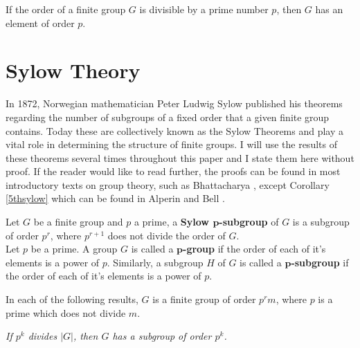 \vspace{-10mm}

\begin{theorem}
     If the order of a finite group $G$ is divisible by a prime number $p$, then $G$ has an element of order $p$. \\
\end{theorem} 

\section{Sylow Theory}

In 1872, Norwegian mathematician Peter Ludwig Sylow published his theorems regarding the number of subgroups of a fixed order that a given finite group contains. 
Today these are collectively known as the Sylow Theorems and play a vital role in determining the structure of finite groups. 
I will use the results of these theorems several times throughout this paper and I state them here without proof. 
If the reader would like to read further, the proofs can be found in most introductory texts on group theory, 
such as Bhattacharya \cite{bhattacharya}, except Corollary \ref{5thsylow} which can be found in Alperin and Bell \cite[p.64]{alperin} . \\


\begin{definition}
Let $G$ be a finite group and $p$ a prime, a \textbf{Sylow $\pmb{p}$-subgroup} of $G$ is a subgroup of order $p^r$, where $p^{r+1}$ does not divide the order of $G$. \\

Let $p$ be a prime. A group $G$ is called a \textbf{$\pmb{p}$-group} if the order of each of it's elements is a power of $p$. 
Similarly, a subgroup $H$ of $G$ is called a \textbf{$\pmb{p}$-subgroup} if the order of each of it's elements is a power of $p$.
\end{definition}

In each of the following results, $G$ is a finite group of order $p^r m$, where $p$ is a prime which does not divide $m$. \\


\begin{theorem}
\textit{If $p^k$ divides $|G|$, then $G$ has a subgroup of order $p^k$.} \\

\end{theorem}

